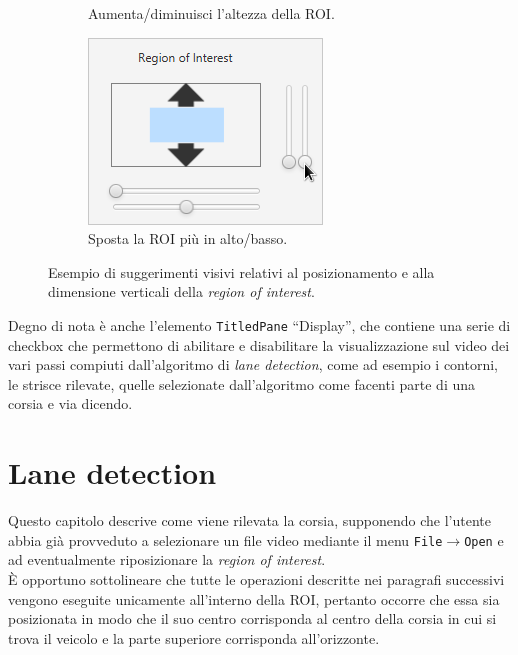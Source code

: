 \documentclass[12pt]{article}
\begin{document}
\begin{figure}[htbp]
\begin{subfigure}[t]{0.32\textwidth}
        \caption{Aumenta/diminuisci l'altezza della ROI.}
    \end{subfigure}
    \begin{subfigure}[t]{0.32\textwidth}
        \includegraphics[width=\textwidth]{3.png}
        \caption{Sposta la ROI più in alto/basso.}
    \end{subfigure}
    \caption{Esempio di suggerimenti visivi relativi al posizionamento e alla dimensione verticali della \textit{region of interest}.}
\end{figure}


Degno di nota è anche l'elemento \texttt{TitledPane} ``Display'', che contiene una serie di checkbox che permettono di abilitare e disabilitare la visualizzazione sul video dei vari passi compiuti dall'algoritmo di \textit{lane detection}, come ad esempio i contorni, le strisce rilevate, quelle selezionate dall'algoritmo come facenti parte di una corsia e via dicendo.

\section{Lane detection}
\hspace{0.2 cm} Questo capitolo descrive come viene rilevata la corsia, supponendo che l'utente abbia già provveduto a selezionare un file video mediante il menu \texttt{File}$ \rightarrow $\texttt{Open} e ad eventualmente riposizionare la \textit{region of interest}.\\
È opportuno sottolineare che tutte le operazioni descritte nei paragrafi successivi vengono eseguite unicamente all'interno della ROI, pertanto occorre che essa sia posizionata in modo che il suo centro corrisponda al centro della corsia in cui si trova il veicolo e la parte superiore corrisponda all'orizzonte.
\end{document}
